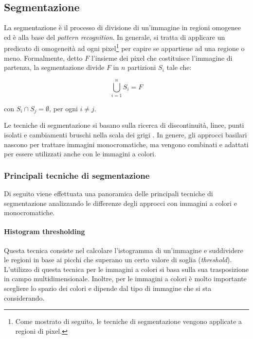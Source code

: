 \subsection{Segmentazione}
La segmentazione è il processo di divisione di un'immagine in regioni omogenee \cite[p.~1]{cheng2001color} ed è alla base del \textit{pattern recognition}. In generale, si tratta di applicare un predicato di omogeneità ad ogni pixel\footnote{Come mostrato di seguito, le tecniche di segmentazione vengono applicate a regioni di pixel.} per capire se appartiene ad una regione o meno. Formalmente, detto $F$ l'insieme dei pixel che costituisce l'immagine di partenza, la segmentazione divide $F$ in $n$ partizioni $S_i$ tale che:

\begin{equation}
    \bigcup\limits_{i=1}^{n} S_{i} =  F
\end{equation}

con $S_i \cap S_j = \emptyset$, per ogni $i \neq j$.

Le tecniche di segmentazione si basano sulla ricerca di discontinuità, linee, punti isolati e cambiamenti bruschi nella scala dei grigi \cite[p.~2]{cheng2001color}. In genere, gli approcci basilari nascono per trattare immagini monocromatiche, ma vengono combinati e adattati per essere utilizzati anche con le immagini a colori.

\subsubsection{Principali tecniche di segmentazione}
Di seguito viene effettuata una panoramica delle principali tecniche di segmentazione analizzando le differenze degli approcci con immagini a colori e monocromatiche.

\paragraph{Histogram thresholding}
Questa tecnica consiste nel calcolare l'istogramma di un'immagine e suddividere le regioni in base ai picchi che superano un certo valore di soglia (\textit{threshold}). L'utilizzo di questa tecnica per le immagini a colori si basa sulla sua trasposizione in campo multidimensionale. Inoltre, per le immagini a colori è molto importante scegliere lo spazio dei colori \cite[p.~3]{cheng2001color} e dipende dal tipo di immagine che si sta considerando.

